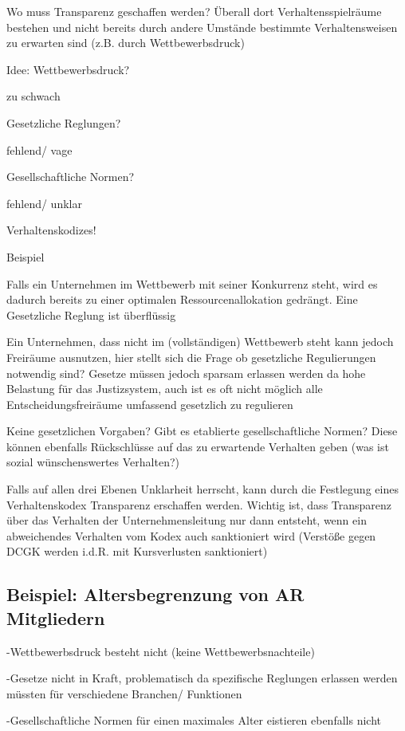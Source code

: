 \documentclass[
]{article}
\begin{document}
Wo muss Transparenz geschaffen werden? Überall dort Verhaltensspielräume
bestehen und nicht bereits durch andere Umstände bestimmte
Verhaltensweisen zu erwarten sind (z.B. durch Wettbewerbsdruck)

Idee: Wettbewerbsdruck?

zu schwach

Gesetzliche Reglungen?

fehlend/ vage

Gesellschaftliche Normen?

fehlend/ unklar

Verhaltenskodizes!

Beispiel

Falls ein Unternehmen im Wettbewerb mit seiner Konkurrenz steht, wird es
dadurch bereits zu einer optimalen Ressourcenallokation gedrängt. Eine
Gesetzliche Reglung ist überflüssig

Ein Unternehmen, dass nicht im (vollständigen) Wettbewerb steht kann
jedoch Freiräume ausnutzen, hier stellt sich die Frage ob gesetzliche
Regulierungen notwendig sind? Gesetze müssen jedoch sparsam erlassen
werden da hohe Belastung für das Justizsystem, auch ist es oft nicht
möglich alle Entscheidungsfreiräume umfassend gesetzlich zu regulieren

Keine gesetzlichen Vorgaben? Gibt es etablierte gesellschaftliche
Normen? Diese können ebenfalls Rückschlüsse auf das zu erwartende
Verhalten geben (was ist sozial wünschenswertes Verhalten?)

Falls auf allen drei Ebenen Unklarheit herrscht, kann durch die
Festlegung eines Verhaltenskodex Transparenz erschaffen werden. Wichtig
ist, dass Transparenz über das Verhalten der Unternehmensleitung nur
dann entsteht, wenn ein abweichendes Verhalten vom Kodex auch
sanktioniert wird (Verstöße gegen DCGK werden i.d.R. mit Kursverlusten
sanktioniert)

\hypertarget{beispiel-altersbegrenzung-von-ar-mitgliedern}{%
\subsection{Beispiel: Altersbegrenzung von AR
Mitgliedern}\label{beispiel-altersbegrenzung-von-ar-mitgliedern}}

-Wettbewerbsdruck besteht nicht (keine Wettbewerbsnachteile)

-Gesetze nicht in Kraft, problematisch da spezifische Reglungen erlassen
werden müssten für verschiedene Branchen/ Funktionen

-Gesellschaftliche Normen für einen maximales Alter eistieren ebenfalls
nicht
\end{document}

